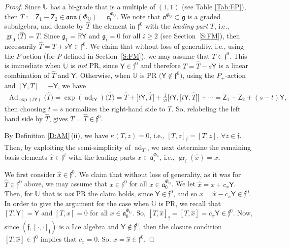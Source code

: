 \documentclass[pdftex]{sigma}%
\DeclareMathOperator{\gr}{gr}
\newcommand{\g}{\mathfrak{g}}
\newcommand\ad{\operatorname{ad}}
\newcommand\Ad{\operatorname{Ad}}
\renewcommand\gr{\operatorname{gr}}
\newcommand\fa{\mathfrak{a}}
\newcommand\fann{\mathfrak{ann}}
\newcommand\ff{\mathfrak{f}}
\newcommand{\R}{\mathbb{R}}
\newcommand\bbU{\mathbb{U}}
\newcommand\sfY{\mathsf{Y}}
\newcommand\sfZ{\mathsf{Z}}
\numberwithin{equation}{section}
\begin{document}
 \begin{proof}
 Since $\bbU$ has a bi-grade that is a multiple of $(1,1)$ (see Table \ref{Tab:EP}), then $ T:=\sfZ_1 -\sfZ_2 \in \fann (\Phi_{\bbU})=\fa^{\Phi_\bbU}_0$. We note that $\fa^{\Phi_\bbU} \subset \g$ is a graded subalgebra, and denote by $\widehat{T}$ the element in $\ff^0$ with the {\em leading part} $T$, i.e., $\gr_0\bigl(\widehat{T}\bigr) = T$. Since $\g_1 = \R \sfY$ and $\g_i = 0$ for all $i \ge 2$ (see Section~\ref{S:FM}), then necessarily $\widehat{T}= T + s \sfY \in \ff^0$. We claim that without loss of generality, i.e., using the $P$-action (for $P$ defined in Section~\ref{S:FM}), we may assume that $T \in \ff^0$. This is immediate when $\bbU$ is {\em not} PR, since $\sfY \in \ff^0$ and therefore $T= \widehat{T}-s\sfY$ is a linear combination of $\widehat{T}$ and $\sfY$. Otherwise, when $\bbU$ is PR $\bigl(\sfY \not\in \ff^0\bigr)$, using the $P_{+}$-action and $[\sfY, T] = -\sfY$, we have
 \begin{align*}
\Ad_{\exp(t\sfY)}\bigl(\widehat{T}\bigr) = \exp(\ad_{t\sfY})\bigl(\widehat{T}\bigr)= \widehat{T} + \big[t\sfY,\widehat{T}\big]+ \frac{1}{2!}\big[t\sfY,\big[t\sfY, \widehat{T}\big]\big] + \cdots= \sfZ_1 - \sfZ_2 + (s-t)\sfY,
 \end{align*}
 then choosing $t=s$ normalizes the right-hand side to $T$. So, relabeling the left hand side by $\widehat{T}$, gives $T = \widehat{T} \in \ff^0$.

By Definition \ref{D:AM}\,(ii), we have
$\kappa(T, z) = 0$, i.e., $[T, z]_\ff = [T, z]$, $\forall z \in \ff$.
Then, by exploiting the semi-simplicity of $\ad_T$, we next determine the remaining basis elements $\widehat{x} \in \ff^i$ with the leading parts $x \in \fa^{\Phi_\bbU}_i$, i.e., $\gr_i(\widehat{x}) = x$.

We first consider $\widehat{x} \in \ff^0$. We claim that without loss of generality, as it was for $\widehat{T} \in \ff^0$ above, we may assume that $x \in \ff^0$ for all $x \in \fa^{\Phi_\bbU}_0$. We let $\widehat{x} = x + c_x \sfY$. Then, for $\bbU$ that is {\em not} PR the claim holds, since $\sfY \in \ff^0$, and so $x = \widehat{x}-c_x\sfY \in \ff^0$. In order to give the argument for the case when $\bbU$ is PR, we recall that $[T, \sfY] = \sfY$ and $[T, x] = 0$ for all $x \in \fa_0^{\Phi_\bbU}$. So, $[T, \widehat{x}]_\ff =[T, \widehat{x}] = c_x \sfY \in \ff^0$. Now, since $(\ff, [\cdot, \cdot]_\ff)$ is a Lie algebra and $\sfY \not \in \ff^0$, then the closure condition $[T, \widehat{x}] \in \ff^0$ implies that $c_x = 0$. So, $x = \widehat{x} \in \ff^0$.


\end{proof}
\end{document}

